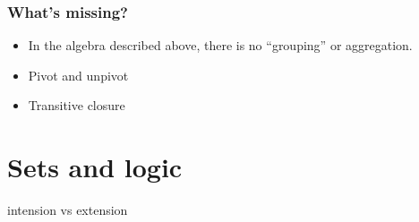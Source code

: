 \documentclass[10pt, a4paper, twocolumn]{article}
\begin{document}
\subsubsection{What's missing?}

\begin{itemize}
\item In the algebra described above, there is no ``grouping'' or aggregation.
\item Pivot and unpivot
\item Transitive closure
\end{itemize}




\section{Sets and logic}




intension vs extension












\printbibliography
\end{document}
